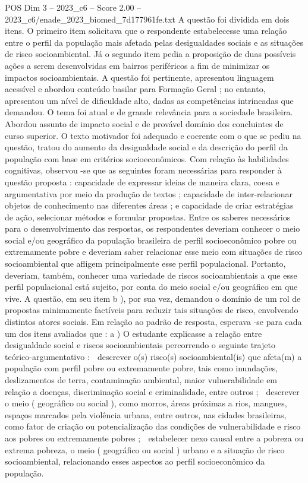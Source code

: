 \begin{textsample}{POS Dim 3 – 2023\_c6 – Score 2.00 – 2023\_c6/enade\_2023\_biomed\_7d177961fe.txt}
A questão foi dividida em dois itens.
O primeiro item solicitava que o respondente estabelecesse uma relação entre o perfil da população mais afetada pelas desigualdades sociais e as situações de risco socioambiental.
Já o segundo item pedia a proposição de duas possíveis ações a serem desenvolvidas em bairros periféricos a fim de minimizar os impactos socioambientais.
A questão foi pertinente, apresentou linguagem acessível e abordou conteúdo basilar para Formação Geral ; no entanto, apresentou um nível de dificuldade alto, dadas as competências intrincadas que demandou.
O tema foi atual e de grande relevância para a sociedade brasileira.
Abordou assunto de impacto social e de provável domínio dos concluintes de curso superior.
O texto motivador foi adequado e coerente com o que se pediu na questão, tratou do aumento da desigualdade social e da descrição do perfil da população com base em critérios socioeconômicos.
Com relação às habilidades cognitivas, observou -se que as seguintes foram necessárias para responder à questão proposta : capacidade de expressar ideias de maneira clara, coesa e argumentativa por meio da produção de textos ; capacidade de inter-relacionar objetos de conhecimento nas diferentes áreas ; e capacidade de criar estratégias de ação, selecionar métodos e formular propostas.
Entre os saberes necessários para o desenvolvimento das respostas, os respondentes deveriam conhecer o meio social e/ou geográfico da população brasileira de perfil socioeconômico pobre ou extremamente pobre e deveriam saber relacionar esse meio com situações de risco socioambiental que afligem principalmente esse perfil populacional.
Portanto, deveriam, também, conhecer uma variedade de riscos socioambientais a que esse perfil populacional está sujeito, por conta do meio social e/ou geográfico em que vive.
A questão, em seu item b ), por sua vez, demandou o domínio de um rol de propostas minimamente factíveis para reduzir tais situações de risco, envolvendo distintos atores sociais.
Em relação ao padrão de resposta, esperava -se para cada um dos itens avaliados que : a ) O estudante explicasse a relação entre desigualdade social e riscos socioambientais percorrendo o seguinte trajeto teórico-argumentativo :  descrever o(s) risco(s) socioambiental(is) que afeta(m) a população com perfil pobre ou extremamente pobre, tais como inundações, deslizamentos de terra, contaminação ambiental, maior vulnerabilidade em relação a doenças, discriminação social e criminalidade, entre outros ;  descrever o meio ( geográfico ou social ), como morros, áreas próximas a rios, mangues, espaços marcados pela violência urbana, entre outros, nas cidades brasileiras, como fator de criação ou potencialização das condições de vulnerabilidade e risco aos pobres ou extremamente pobres ;  estabelecer nexo causal entre a pobreza ou extrema pobreza, o meio ( geográfico ou social ) urbano e a situação de risco socioambiental, relacionando esses aspectos ao perfil socioeconômico da população.

\end{textsample}
